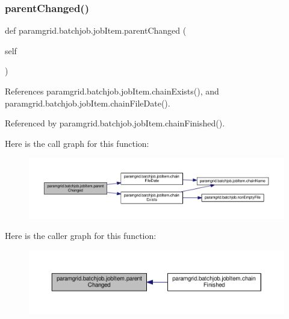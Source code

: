 \subsubsection{\texorpdfstring{parent\+Changed()}{parentChanged()}}
{\footnotesize\ttfamily def paramgrid.\+batchjob.\+job\+Item.\+parent\+Changed (\begin{DoxyParamCaption}\item[{}]{self }\end{DoxyParamCaption})}



References paramgrid.\+batchjob.\+job\+Item.\+chain\+Exists(), and paramgrid.\+batchjob.\+job\+Item.\+chain\+File\+Date().



Referenced by paramgrid.\+batchjob.\+job\+Item.\+chain\+Finished().

Here is the call graph for this function\+:
\nopagebreak
\begin{figure}[H]
\begin{center}
\leavevmode
\includegraphics[width=350pt]{classparamgrid_1_1batchjob_1_1jobItem_a324b9ccf7caf3955d49e423da96c6c8c_cgraph}
\end{center}
\end{figure}
Here is the caller graph for this function\+:
\nopagebreak
\begin{figure}[H]
\begin{center}
\leavevmode
\includegraphics[width=350pt]{classparamgrid_1_1batchjob_1_1jobItem_a324b9ccf7caf3955d49e423da96c6c8c_icgraph}
\end{center}
\end{figure}
\mbox{\label{classparamgrid_1_1batchjob_1_1jobItem_abedf1639a7b1212c030844b523747d0c}} 
